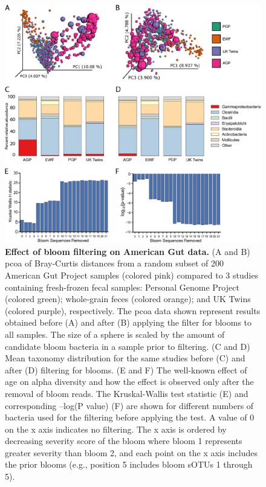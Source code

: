 \begin{figure}[htbp]
\includegraphics[width=\columnwidth]{chapter_contributions_figures/bloom.pdf}
\caption[Effect of bloom filtering on American Gut data]{\textbf{Effect of bloom filtering on American Gut data.}
(A and B) \gls{pcoa} of Bray-Curtis distances from a random subset of 200 American Gut Project samples (colored pink)
compared to 3 studies containing fresh-frozen fecal samples: Personal Genome Project (colored green);
whole-grain feces \cite{Vitaglione2015} (colored orange); and UK Twins \cite{Goodrich2017} (colored purple), respectively.
The \gls{pcoa} data shown represent results obtained before (A) and after (B) applying the
filter for blooms to all samples. The size of a sphere is scaled by the amount of
candidate bloom bacteria in a sample prior to filtering. (C and D) Mean taxonomy distribution for the
same studies before (C) and after (D) filtering for blooms. (E and F) The well-known effect of age on
alpha diversity and how the effect is observed only after the removal of bloom reads.
The Kruskal-Wallis test statistic (E) and corresponding –log(P value) (F) are shown for
different numbers of bacteria used for the filtering before applying the test. A value of 0 on the
x axis indicates no filtering. The x axis is ordered by decreasing severity score of the bloom where bloom
1 represents greater severity than bloom 2, and each point on the x axis includes the prior blooms
(e.g., position 5 includes bloom sOTUs 1 through 5).}
\label{bloomFig}
\end{figure}
